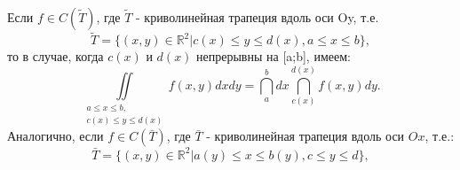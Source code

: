 Если $f \in C(\widetilde{T})$, где $\widetilde{T}$ - криволинейная трапеция вдоль оси Oy, т.е.
\begin{equation}
	\label{eq:6.3-19}
	\widetilde{T} = \{(x,y)\in\mathbb{R}^2 | c(x) \leqslant y \leqslant d(x), a \leqslant x \leqslant b\},
\end{equation}
то в случае, когда $ c(x) $ и $ d(x) $ непрерывны на [a;b], имеем:
\begin{equation}
	\label{eq:6.3-20}
	\iint\limits_{\substack{a \leqslant x \leqslant b, \\ c(x) \leqslant y \leqslant d(x)}}
	f(x,y)dxdy = \dint\limits_a^b dx \dint\limits_{c(x)}^{d(x)} f(x,y)dy.
\end{equation}
Аналогично, если $f \in C(\bar{T})$, где $\bar{T}$ - криволинейная трапеция вдоль оси $ Ox $, т.е.:
\begin{equation}
	\label{eq:6.3-21}
	\bar{T} = \{(x,y)\in\mathbb{R}^2 | a(y) \leqslant x \leqslant b(y), c \leqslant y \leqslant d \},
\end{equation}

